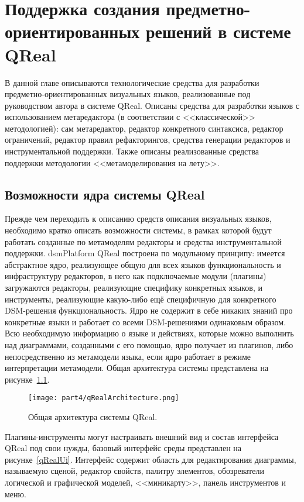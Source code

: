 \chapter{Поддержка создания предметно-ориентированных решений в системе QReal}
\label{chapter:implementation}

В данной главе описываются технологические средства для разработки предметно-ориентированных 
визуальных языков, реализованные под руководством автора в системе QReal. Описаны 
средства для разработки языков с использованием метаредактора (в соответствии с <<классической>> 
методологией): сам метаредактор, редактор конкретного синтаксиса, редактор ограничений, 
редактор правил рефакторингов, средства генерации редакторов и инструментальной поддержки. 
Также описаны реализованные средства поддержки методологии <<метамоделирования на лету>>.

\section{Возможности ядра системы QReal}
Прежде чем переходить к описанию средств описания визуальных языков, необходимо кратко 
описать возможности системы, в рамках которой будут работать созданные по метамоделям 
редакторы и средства инструментальной поддержки. \ac{dsmPlatform} QReal построена по 
модульному принципу: имеется абстрактное ядро, реализующее общую для всех языков функциональность 
и инфраструктуру редакторов, в него как подключаемые модули (плагины) загружаются редакторы, 
реализующие специфику конкретных языков, и инструменты, реализующие какую-либо ещё 
специфичную для конкретного \ac{DSM}-решения функциональность. Ядро не содержит в себе 
никаких знаний про конкретные языки и работает со всеми \ac{DSM}-решениями одинаковым образом. 
Всю необходимую информацию о языке и действиях, которые можно выполнить над диаграммами, 
созданными с его помощью, ядро получает из плагинов, либо непосредственно из метамодели 
языка, если ядро работает в режиме интерпретации метамодели. Общая архитектура системы 
представлена на рисунке~\ref{qRealArchitecture}.

\begin{figure} [ht]
	\begin{center}
		\texttt{[image: part4/qRealArchitecture.png]}
		\caption{Общая архитектура системы QReal.}
		\label{qRealArchitecture}
	\end{center}
\end{figure}

Плагины-инструменты могут настраивать внешний вид и состав интерфейса QReal под свои 
нужды, базовый интерфейс среды представлен на рисунке~\ref{qRealUi}. Интерфейс содержит 
область для редактирования диаграммы, называемую сценой, редактор свойств, палитру 
элементов, обозреватели логической и графической моделей, <<миникарту>>, панель инструментов и меню.


